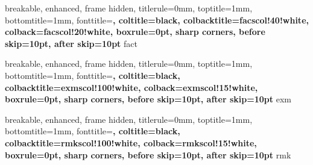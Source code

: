 {
breakable,
    enhanced,
    frame hidden,
    titlerule=0mm,
    toptitle=1mm,
    bottomtitle=1mm,
    fonttitle=\bfseries\large,
    coltitle=black,
    colbacktitle=facscol!40!white,
    colback=facscol!20!white,
    boxrule=0pt, sharp corners,
    before skip=10pt, after skip=10pt
}{fact}



{
breakable,
    enhanced,
    frame hidden,
    titlerule=0mm,
    toptitle=1mm,
    bottomtitle=1mm,
    fonttitle=\bfseries\large,
    coltitle=black,
    colbacktitle=exmscol!100!white,
    colback=exmscol!15!white,
    boxrule=0pt, sharp corners,
    before skip=10pt, after skip=10pt
}{exm}


{
breakable,
    enhanced,
    frame hidden,
    titlerule=0mm,
    toptitle=1mm,
    bottomtitle=1mm,
    fonttitle=\bfseries\large,
    coltitle=black,
    colbacktitle=rmkscol!100!white,
    colback=rmkscol!15!white,
    boxrule=0pt, sharp corners,
    before skip=10pt, after skip=10pt
}{rmk}

